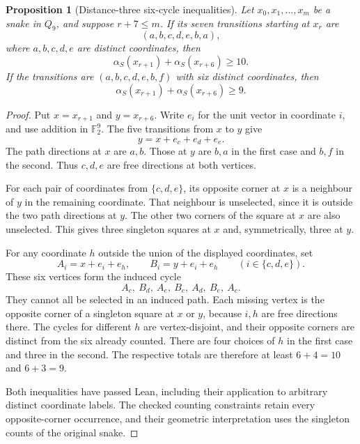 \documentclass[11pt,a4paper]{article}
\newtheorem{proposition}[theorem]{Proposition}
\theoremstyle{definition}
\theoremstyle{remark}
\newcommand{\Q}{Q}
\begin{document}
\begin{proposition}[Distance-three six-cycle inequalities]\label{prop:distance-three-pair}
Let $x_0,x_1,\ldots,x_m$ be a snake in $\Q_9$, and suppose $r+7\le m$.
If its seven transitions starting at $x_r$ are
\[
(a,b,c,d,e,b,a),
\]
where $a,b,c,d,e$ are distinct coordinates, then
\[
\alpha_S(x_{r+1})+\alpha_S(x_{r+6})\ge10.
\]
If the transitions are $(a,b,c,d,e,b,f)$ with six distinct coordinates, then
\[
\alpha_S(x_{r+1})+\alpha_S(x_{r+6})\ge9.
\]
\end{proposition}
\begin{proof}
Put $x=x_{r+1}$ and $y=x_{r+6}$. Write $e_i$ for the unit vector in coordinate $i$, and use addition in $\mathbb F_2^9$. The five transitions from $x$ to $y$ give
\[
y=x+e_c+e_d+e_e.
\]
The path directions at $x$ are $a,b$. Those at $y$ are $b,a$ in the first case and $b,f$ in the second. Thus $c,d,e$ are free directions at both vertices.

For each pair of coordinates from $\{c,d,e\}$, its opposite corner at $x$ is a neighbour of $y$ in the remaining coordinate. That neighbour is unselected, since it is outside the two path directions at $y$. The other two corners of the square at $x$ are also unselected. This gives three singleton squares at $x$ and, symmetrically, three at $y$.

For any coordinate $h$ outside the union of the displayed coordinates, set
\[
A_i=x+e_i+e_h,\qquad B_i=y+e_i+e_h\qquad(i\in\{c,d,e\}).
\]
These six vertices form the induced cycle
\[
A_c,\ B_d,\ A_e,\ B_c,\ A_d,\ B_e,\ A_c.
\]
They cannot all be selected in an induced path. Each missing vertex is the opposite corner of a singleton square at $x$ or $y$, because $i,h$ are free directions there. The cycles for different $h$ are vertex-disjoint, and their opposite corners are distinct from the six already counted. There are four choices of $h$ in the first case and three in the second. The respective totals are therefore at least $6+4=10$ and $6+3=9$.

Both inequalities have passed Lean, including their application to arbitrary distinct coordinate labels. The checked counting constraints retain every opposite-corner occurrence, and their geometric interpretation uses the singleton counts of the original snake.
\end{proof}
\end{document}
